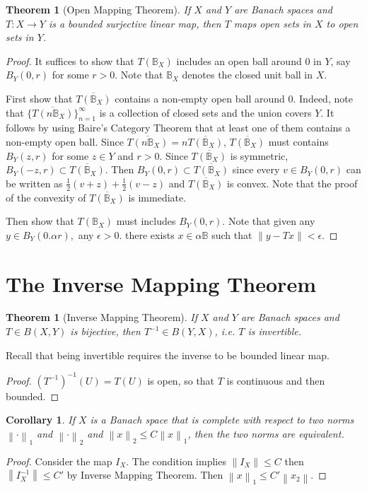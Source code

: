 \documentclass[12pt,a4paper]{report}
\numberwithin{equation}{section}
\theoremstyle{mystyle}
\newtheorem{theorem}[definition]{Theorem}
\newtheorem{corollary}[definition]{Corollary}
\newcommand{\norm}[1]{\left\lVert #1 \right\rVert}
\begin{document}
	\begin{theorem}[Open Mapping Theorem]
		If $X$ and $Y$ are Banach spaces and $T:X\to Y$ is a bounded surjective linear map, then $T$ maps open sets in $X$ to open sets in $Y$.
	\end{theorem}
	\begin{proof}
		It suffices to show that $T(\mathbb{B}_X)$ includes an open ball around $0$ in $Y$, say $B_Y(0,r)$ for some $r>0$. Note that $\mathbb{B}_X$ denotes the closed unit ball in $X$.
		
		First show that $\overline{T(\mathbb{B}_X)}$ contains a non-empty open ball around $0$. Indeed, note that $\{\overline{T(n\mathbb{B}_X)}\}_{n=1}^\infty$ is a collection of closed sets and the union covers $Y$. It follows by using Baire's Category Theorem that at least one of them contains a non-empty open ball. Since $\overline{T(n\mathbb{B}_X)}=n\overline{T(\mathbb{B}_X)}$, $\overline{T(\mathbb{B}_X)}$ must contains $B_Y(z,r)$ for some $z\in Y$ and $r>0$. Since $\overline{T(\mathbb{B}_X)}$ is symmetric, $B_Y(-z,r)\subset \overline{T(\mathbb{B}_X)}$. Then $B_Y(0,r)\subset \overline{T(\mathbb{B}_X)}$ since every $v\in B_Y(0,r)$ can be written as $\frac{1}{2}(v+z)+\frac{1}{2}(v-z)$ and $\overline{T(\mathbb{B}_X)}$ is convex. Note that the proof of the convexity of $\overline{T(\mathbb{B}_X)}$ is immediate.
		
		Then show that $T(\mathbb{B}_X)$ must includes $B_Y(0,r)$. Note that given any $y\in B_Y(0.\alpha r),$ any $\epsilon >0$. there exists $x\in \alpha \mathbb{B}$ such that $\norm{y-Tx}<\epsilon$.
	\end{proof}
	
	
	\section{The Inverse Mapping Theorem}
	\begin{theorem}[Inverse Mapping Theorem]
		If $X$ and $Y$ are Banach spaces and $T\in B(X,Y)$ is bijective, then $T^{-1}\in B(Y,X)$, i.e. $T$ is invertible.
	\end{theorem}
	Recall that being invertible requires the inverse to be bounded linear map.
	\begin{proof}
		$(T^{-1})^{-1}(U)=T(U)$ is open, so that $T$ is continuous and then bounded.
	\end{proof}
	
	\begin{corollary}
		If $X$ is a Banach space that is complete with respect to two norms $\norm{\cdot}_1$ and $\norm{\cdot}_2$ and $\norm{x}_2\leq C\norm{x}_1$, then the two norms are equivalent.
	\end{corollary}
	\begin{proof}
		Consider the map $I_X$. The condition implies $\norm{I_X}\leq C$ then $\norm{I_X^{-1}}\leq C'$ by Inverse Mapping Theorem. Then $\norm{x}_1\leq C' \norm{x_2}$.
	\end{proof}
	
\end{document}
